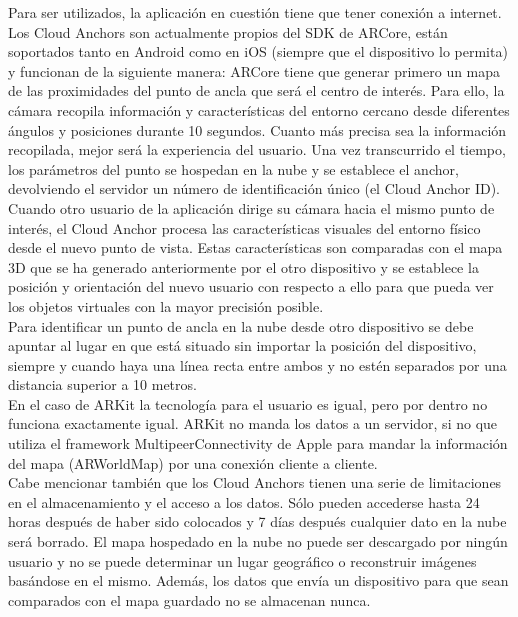 Para ser utilizados, la aplicación en cuestión tiene que tener conexión a internet.
Los Cloud Anchors son actualmente propios del SDK de ARCore, están soportados tanto en Android como en iOS (siempre que el dispositivo lo permita) y funcionan de la siguiente manera: ARCore tiene que generar primero un mapa de las proximidades del punto de ancla que será el centro de interés. Para ello, la cámara recopila información y características del entorno cercano desde diferentes ángulos y posiciones durante 10 segundos. Cuanto más precisa sea la información recopilada, mejor será la experiencia del usuario. Una vez transcurrido el tiempo, los parámetros del punto se hospedan en la nube y se establece el anchor, devolviendo el servidor un número de identificación único (el Cloud Anchor ID). Cuando otro usuario de la aplicación dirige su cámara hacia el mismo punto de interés, el Cloud Anchor procesa las características visuales del entorno físico desde el nuevo punto de vista. Estas características son comparadas con el mapa 3D que se ha generado anteriormente por el otro dispositivo y se establece la posición y orientación del nuevo usuario con respecto a ello para que pueda ver los objetos virtuales con la mayor precisión posible.\\

Para identificar un punto de ancla en la nube desde otro dispositivo se debe apuntar al lugar en que está situado sin importar la posición del dispositivo, siempre y cuando haya una línea recta entre ambos y no estén separados por una distancia superior a 10 metros.\\

En el caso de ARKit la tecnología para el usuario es igual, pero por dentro no funciona exactamente igual. ARKit no manda los datos a un servidor, si no que utiliza el framework MultipeerConnectivity de Apple para mandar la información del mapa (ARWorldMap) por una conexión cliente a cliente. \cite{Apple_CloudAnchor}\\

Cabe mencionar también que los Cloud Anchors tienen una serie de limitaciones en el almacenamiento y el acceso a los datos. Sólo pueden accederse hasta 24 horas después de haber sido colocados y 7 días después cualquier dato en la nube será borrado. El mapa hospedado en la nube no puede ser descargado por ningún usuario y no se puede determinar un lugar geográfico o reconstruir imágenes basándose en el mismo. Además, los datos que envía un dispositivo para que sean comparados con el mapa guardado no se almacenan nunca.\\

